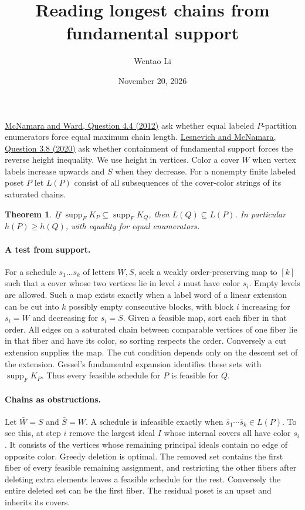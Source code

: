\documentclass[11pt]{article}
\title{Reading longest chains from fundamental support}
\author{Wentao Li}
\date{November 20, 2026}
\newtheorem{theorem}{Theorem}
\begin{document}
\maketitle

\href{https://arxiv.org/abs/1210.2412}{McNamara and Ward, Question 4.4 (2012)} ask whether equal labeled $P$-partition enumerators force equal maximum chain length. \href{https://arxiv.org/abs/2006.10087}{Lesnevich and McNamara, Question 3.8 (2020)} ask whether containment of fundamental support forces the reverse height inequality. We use height in vertices. Color a cover $W$ when vertex labels increase upwards and $S$ when they decrease. For a nonempty finite labeled poset $P$ let $L(P)$ consist of all subsequences of the cover-color strings of its saturated chains.
\begin{theorem}If $\operatorname{supp}_F K_P\subseteq\operatorname{supp}_F K_Q$, then $L(Q)\subseteq L(P)$. In particular $h(P)\ge h(Q)$, with equality for equal enumerators.\end{theorem}
\paragraph{A test from support.}
For a schedule $s_1\dots s_k$ of letters $W,S$, seek a weakly order-preserving map to $[k]$ such that a cover whose two vertices lie in level $i$ must have color $s_i$. Empty levels are allowed. Such a map exists exactly when a label word of a linear extension can be cut into $k$ possibly empty consecutive blocks, with block $i$ increasing for $s_i=W$ and decreasing for $s_i=S$. Given a feasible map, sort each fiber in that order. All edges on a saturated chain between comparable vertices of one fiber lie in that fiber and have its color, so sorting respects the order. Conversely a cut extension supplies the map. The cut condition depends only on the descent set of the extension. Gessel's fundamental expansion identifies these sets with $\operatorname{supp}_F K_P$. Thus every feasible schedule for $P$ is feasible for $Q$.
\paragraph{Chains as obstructions.}
Let $\bar W=S$ and $\bar S=W$. A schedule is infeasible exactly when $\bar s_1\cdots\bar s_k\in L(P)$. To see this, at step $i$ remove the largest ideal $I$ whose internal covers all have color $s_i$. It consists of the vertices whose remaining principal ideals contain no edge of opposite color. Greedy deletion is optimal. The removed set contains the first fiber of every feasible remaining assignment, and restricting the other fibers after deleting extra elements leaves a feasible schedule for the rest. Conversely the entire deleted set can be the first fiber. The residual poset is an upset and inherits its covers.
\end{document}
